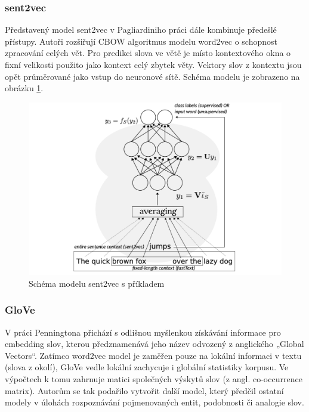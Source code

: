 \documentclass[thesis=M,czech]{FITthesis}[2019/12/23]
\begin{document}
\subsubsection*{sent2vec}
Představený model sent2vec v Pagliardiniho\cite{pagliardini2018} práci dále kombinuje předešlé přístupy. Autoři rozšiřují CBOW algoritmus modelu word2vec o schopnost zpracování celých vět. Pro predikci slova ve větě je místo kontextového okna o fixní velikosti použito jako kontext celý zbytek věty. Vektory slov z kontextu jsou opět průměrované jako vstup do neuronové sítě. Schéma modelu je zobrazeno na obrázku \ref{fig:palachy2019sent2vec}.
\begin{figure}\centering
	\includegraphics[width=\textwidth]{images/palachy2019/palachy2019_sent2vec.png}
	\caption{Schéma modelu sent2vec s příkladem\cite{palachy2019}}\label{fig:palachy2019sent2vec}
\end{figure}

\subsubsection*{GloVe}
V práci Penningtona\cite{pennington2014} přichází s odlišnou myšlenkou získávání informace pro embedding slov, kterou předznamenává jeho název odvozený z anglického „Global Vectors“. Zatímco word2vec model je zaměřen pouze na lokální informaci v textu (slova z okolí), GloVe vedle lokální zachycuje i globální statistiky korpusu. Ve výpočtech k tomu zahrnuje matici společných výskytů slov (z angl. co-occurrence matrix). Autorům se tak podařilo vytvořit další model, který předčil ostatní modely v úlohách rozpoznávání pojmenovaných entit, podobnosti či analogie slov.
\end{document}
